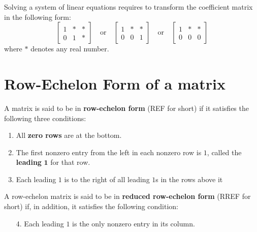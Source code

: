 \documentclass[20pt,a4paper]{extarticle}
\newcounter{definition}
\begin{document}
Solving a system of linear equations requires to transform the coefficient matrix in the following form:
	\[
		\begin{bmatrix}
		1 & * & * \\ 0 & 1 & *
		\end{bmatrix}
		\quad \text{or} \quad 
		\begin{bmatrix}
		1 & * & * \\ 0 & 0 & 1
		\end{bmatrix} 
		\quad \text{or} \quad 
		\begin{bmatrix}
		1 & * & * \\ 
		0 & 0 & 0 
		\end{bmatrix} 
	\]
where $*$ denotes any real number.

\newpage 

\section{Row-Echelon Form of a matrix}

\begin{definition}
A matrix is said to be in \textbf{row-echelon form} (REF for short) if it satisfies the following three conditions:
	\begin{enumerate}[label=\arabic*.]
	\item All \textbf{zero rows} are at the bottom.
	\item The first nonzero entry from the left in each nonzero row is $1$, called the \textbf{leading} $\mathbf{1}$ for that row.
	\item Each leading $1$ is to the right of all leading $1$s in the rows above it
\end{enumerate}
\end{definition}

\begin{definition}
A row-echelon matrix is said to be in \textbf{reduced row-echelon form} (RREF for short) if, in addition, it satisfies the following condition:
	\begin{enumerate}
		\item[4.] Each leading $1$ is the only nonzero entry in its column.
	\end{enumerate}
\end{definition}

\vspace*{12pt}
\end{document}
